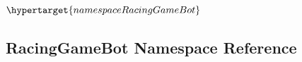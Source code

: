 
$\hypertarget{namespaceRacingGameBot}${}
\subsection{RacingGameBot Namespace Reference}
\label{namespaceRacingGameBot}
